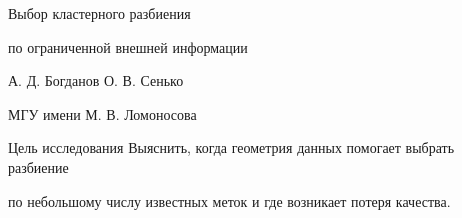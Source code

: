 \documentclass[11pt,aspectratio=169]{beamer}
\begin{document}
\begin{frame}
\vspace{0.3cm}
\begin{center}
{\color{accent}\fontsize{23}{27}\selectfont Выбор кластерного разбиения\par по ограниченной внешней информации\par}
\vspace{0.8cm}
А. Д. Богданов \quad О. В. Сенько\par
\smallskip
{\color{muted}МГУ имени М. В. Ломоносова}\par
\vspace{0.8cm}
\end{center}
\begin{block}{Цель исследования}
Выяснить, когда геометрия данных помогает выбрать разбиение\par
по небольшому числу известных меток и где возникает потеря качества.
\end{block}
\end{frame}
\end{document}
